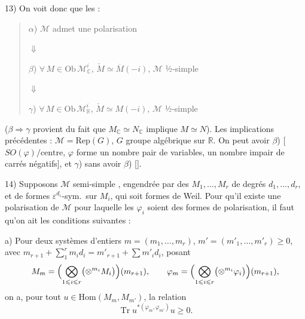\documentclass[11pt,a4paper]{article}
\begin{document}
13) On voit donc que les  :
\begin{quote}
$\alpha$) $\mathcal{M}$ admet une polarisation 

$\Downarrow$

$\beta$) $\forall\, M \in \mathrm{Ob}\,\mathcal{M}^{i}_{\mathbb{C}}$,
$\check{M} \simeq \overline{M}(-i)$, $\mathcal{M}$ ½-simple

$\Downarrow$

$\gamma$) $\forall\, M \in \mathrm{Ob}\,\mathcal{M}^{i}_{\mathbb{R}}$,
$\check{M} \simeq M(-i)$, $\mathcal{M}$ ½-simple
\end{quote}
($\beta \Longrightarrow \gamma$ provient du fait que $M_{\mathbb{C}} \simeq
N_{\mathbb{C}}$ implique $M \simeq N$).
Les implications précédentes  : $\mathcal{M}
= \mathrm{Rep}(G)$, $G$ groupe algébrique \struck{\ill{}} sur $\mathbb{R}$. On
peut avoir $\beta$)  [
$SO(\varphi)/\text{centre}$, $\varphi$ forme  un nombre pair de
variables,  un nombre impair de carrés négatifs], et
$\gamma$) sans avoir $\beta$) [\ill{}].

14) Supposons $\mathcal{M}$ semi-simple ,
engendrée \struck{\ill{}}  par des $M_1, \ldots, M_r$
de degrés $d_1, \ldots, d_r$,  \struck{\ill{}} et de
formes $\varepsilon^{d_i}$-sym.\ sur $M_i$, qui soit \struck{\ill{}} formes de
Weil. \struck{\ill{}} Pour qu'il existe une polarisation de $\mathcal{M}$
 pour laquelle les $\varphi_i$ soient des formes de
polarisation, il faut qu'on ait les conditions suivantes :

a) Pour deux systèmes d'entiers $m = (m_1, \ldots, m_r)$,
$m' = (m'_1, \ldots, m'_r) \geqslant 0$, avec
$m_{r+1} + \sum_{1}^{r} m_i d_i = m'_{r+1} + \sum m'_i d_i$, posant
\[
M_m = \Bigl(\bigotimes_{1 \leqslant i \leqslant r} \bigl(\otimes^{m_i} M_i\bigr)\Bigr)(m_{r+1}),
\qquad
\varphi_m = \Bigl(\bigotimes_{1 \leqslant i \leqslant r} \bigl(\otimes^{m_i} \varphi_i\bigr)\Bigr)(m_{r+1}),
\]
on a, pour tout $u \in \mathrm{Hom}(M_m, M_{m'})$, la relation
\[
\operatorname{Tr} u^{*(\varphi_m, \varphi_{m'})} u \geqslant 0.
\]
\end{document}
